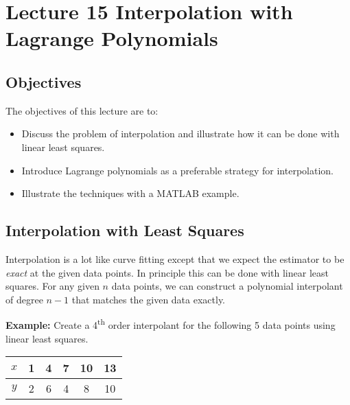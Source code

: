 \chapter{Lecture 15 Interpolation with Lagrange Polynomials}
\label{ch:lec15n}
\section{Objectives}
The objectives of this lecture are to:
\begin{itemize}
\item Discuss the problem of interpolation and illustrate how it can be done with linear least squares.
\item Introduce Lagrange polynomials as a preferable strategy for interpolation.
\item Illustrate the techniques with a MATLAB example.
\end{itemize}
\setcounter{lstannotation}{0}

\section{Interpolation with Least Squares}

Interpolation is a lot like curve fitting except that we expect the estimator to be \emph{exact} at the given data points.  In principle this can be done with linear least squares.  For any given $n$ data points, we can construct a polynomial interpolant of degree $n-1$ that matches the given data exactly.

\vspace{0.15cm}

\noindent \textbf{Example: } Create a 4\textsuperscript{th} order interpolant for the following 5 data points using linear least squares.

\begin{table}
\begin{tabular}{|c|c|c|c|c|c|}
\hline
$x$ & 1 & 4 & 7 & 10 & 13 \\ \hline
$y$ & 2 & 6 & 4 & 8 & 10 \\ \hline
\end{tabular}
\end{table}

\vspace{0.2cm} 

